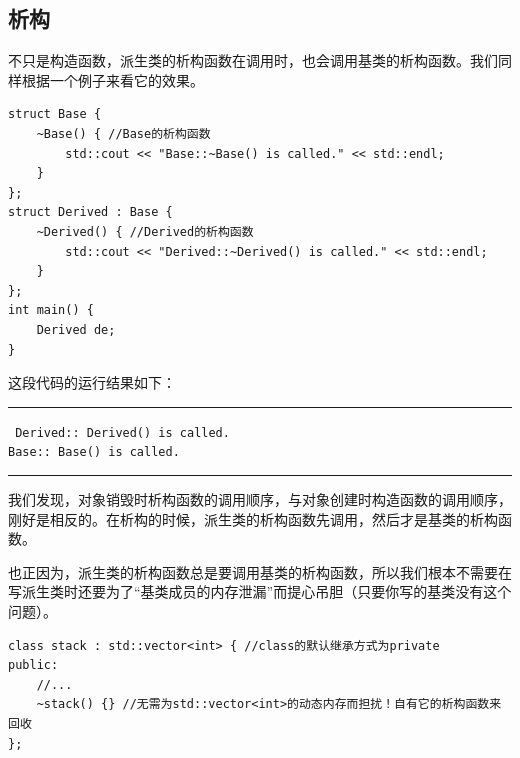 \subsection*{析构}
不只是构造函数，派生类的析构函数在调用时，也会调用基类的析构函数。我们同样根据一个例子来看它的效果。
\begin{lstlisting}
struct Base {
    ~Base() { //Base的析构函数
        std::cout << "Base::~Base() is called." << std::endl;
    }
};
struct Derived : Base {
    ~Derived() { //Derived的析构函数
        std::cout << "Derived::~Derived() is called." << std::endl;
    }
};
int main() {
    Derived de;
}
\end{lstlisting}
这段代码的运行结果如下：\\\noindent\rule{\linewidth}{.2pt}\texttt{
Derived::~Derived() is called.\\
Base::~Base() is called.
}\\\noindent\rule{\linewidth}{.2pt}
我们发现，对象销毁时析构函数的调用顺序，与对象创建时构造函数的调用顺序，刚好是相反的。在析构的时候，派生类的析构函数先调用，然后才是基类的析构函数。\par
也正因为，派生类的析构函数总是要调用基类的析构函数，所以我们根本不需要在写派生类时还要为了``基类成员的内存泄漏''而提心吊胆（只要你写的基类没有这个问题）。
\begin{lstlisting}
class stack : std::vector<int> { //class的默认继承方式为private
public:
    //...
    ~stack() {} //无需为std::vector<int>的动态内存而担扰！自有它的析构函数来回收
};
\end{lstlisting}\par
